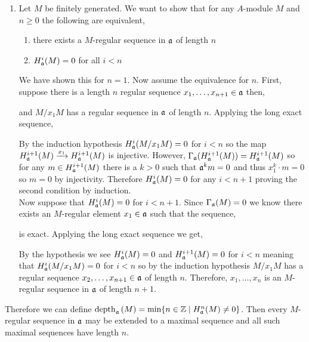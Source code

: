 \documentclass[12pt]{article}
\begin{document}
\begin{enumerate}
\item Let $M$ be finitely generated. We want to show that for any $A$-module $M$ and $n \ge 0$ the following are equivalent,
\begin{enumerate}
\item there exists a $M$-regular sequence in $\mathfrak{a}$ of length $n$
\item $H^i_{\mathfrak{a}}(M) = 0$ for all $i < n$
\end{enumerate}
We have shown this for $n = 1$. Now assume the equivalence for $n$. First, suppose there is a length $n$ regular sequence $x_1, \dots, x_{n+1} \in \mathfrak{a}$ then,
\begin{center}
\end{center}
and $M / x_1 M$ has a regular sequence in $\mathfrak{a}$ of length $n$. Applying the long exact sequence,
\begin{center}
\end{center}
By the induction hypothesis $H^i_{\mathfrak{a}}(M/x_1M) = 0$ for $i < n$ so the map $H^{i + 1}_{\mathfrak{a}}(M) \xrightarrow{x_1} H^{i + 1}_{\mathfrak{a}}(M)$ is injective. However, $\Gamma_{\mathfrak{a}}(H^{i+1}_{\mathfrak{a}}(M)) = H^{i+1}_{\mathfrak{a}}(M)$ so for any $m \in H^{i+1}_{\mathfrak{a}}(M)$ there is a $k > 0$ such that $\mathfrak{a}^k m = 0$ and thus $x_1^k \cdot m = 0$ so $m = 0$ by injectivity. Therefore $H^{i}_{\mathfrak{a}}(M) = 0$ for any $i < n + 1$ proving the second condition by induction.
\bigskip\\
Now suppose that $H^i_{\mathfrak{a}}(M) = 0$ for $i < n + 1$. Since $\Gamma_{\mathfrak{a}}(M) = 0$ we know there exists an $M$-regular element $x_1 \in \mathfrak{a}$ such that the sequence,
\begin{center}
\end{center}
is exact. Applying the long exact sequence we get,
\begin{center}
\end{center}
By the hypothesis we see $H^i_{\mathfrak{a}}(M) = 0$ and $H^{i+1}_{\mathfrak{a}}(M) = 0$ for $i < n$ meaning that $H^i_{\mathfrak{a}}(M/x_1 M) = 0$ for $i < n$ so by the induction hypothesis $M / x_1 M$ has a regular sequence $x_2, \dots, x_{n+1} \in \mathfrak{a}$ of length $n$. Therefore, $x_1, \dots, x_n$ is an $M$-regular sequence in $\mathfrak{a}$ of length $n+1$. 
\end{enumerate}
\noindent
Therefore we can define $\mathrm{depth}_{\mathfrak{a}} \left( M \right) = \min \{ n \in \mathbb{Z} \mid H^n_{\mathfrak{a}}(M) \neq 0 \}$. Then every $M$-regular sequence in $\mathfrak{a}$ may be extended to a maximal sequence and all such maximal sequences have length $n$.
\end{document}
